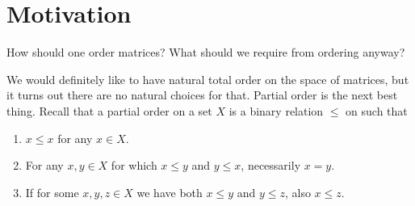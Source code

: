 \begin{comment}
\section{Matrices and computation}

We have made whole bunch of definitions and observations concerning positive matrices, but just because we know how to define something doesn't mean we can calculate it. In some cases, calculations are just as easy the proofs, but in many cases one needs further ideas. What follows is a hopefully useful collection of information on how to really calculate things.

\begin{itemize}
	\item How to calculate adjoint of a map?
	\item How to calculate spectral composition of a map?
	\item How to calculate square root of a map?
	\item How to check if a map is positive?
	\item How to check if a map is strictly positive?
	\item If map $A$ is not positive, how to find a vector $v \in V$ such that $Q_{A}(v) < 0$.
	\item How to calculate a polar decomposition of a map?
	\item If $A$ and $B$ are $*$-adjoint, how to find $C$ such that $A = C^{*} B C$?
	\item How to calculate projection matrices?
\end{itemize}

\section{Positivity without inner-product}

\end{comment}


\section{Motivation}

How should one order matrices? What should we require from ordering anyway?

We would definitely like to have natural total order on the space of matrices, but it turns out there are no natural choices for that. Partial order is the next best thing. Recall that a partial order on a set $X$ is a binary relation $\leq$ on such that
\begin{enumerate}
	\item $x \leq x$ for any $x \in X$.
	\item For any $x, y \in X$ for which $x \leq y$ and $y \leq x$, necessarily $x = y$.
	\item If for some $x, y, z \in X$ we have both $x \leq y$ and $y \leq z$, also $x \leq z$.
\end{enumerate}

